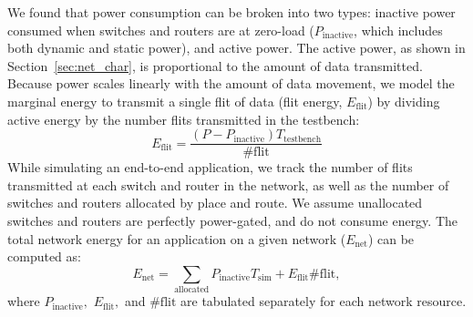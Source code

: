 We found that power consumption can be broken into two types: 
inactive power consumed when switches and routers are at zero-load ($P_{\text{inactive}}$, which includes both dynamic and static power),
and active power. The active power, as shown in Section~\ref{sec:net_char}, is proportional to the amount of
data transmitted. 
Because power scales linearly with the amount of data movement, we model the marginal energy to transmit a single flit of data (flit energy, $E_{\text{flit}}$) by dividing active energy by the number flits transmitted in the testbench:
\begin{equation}
  E_{\text{flit}} = \frac{\left(P-P_{\text{inactive}}\right) T_{\text{testbench}}}{\#\text{flit}} 
\end{equation}
While simulating an end-to-end application, we track the number of flits transmitted at each switch and router in the network, as well as the number of switches and routers allocated by place and route. 
We assume unallocated switches and routers are perfectly power-gated, and do not consume energy.
The total network energy for an application on a given network ($E_{\text{net}}$) can be computed as:
\begin{equation}
  E_{\text{net}} = \sum_{\text{allocated}} P_{\text{inactive}} T_{\text{sim}}
  + E_{\text{flit}}  \#\text{flit},
\end{equation}
where $P_{\text{inactive}},$ $E_{\text{flit}},$ and $\#\text{flit}$ are tabulated separately for each network resource.


